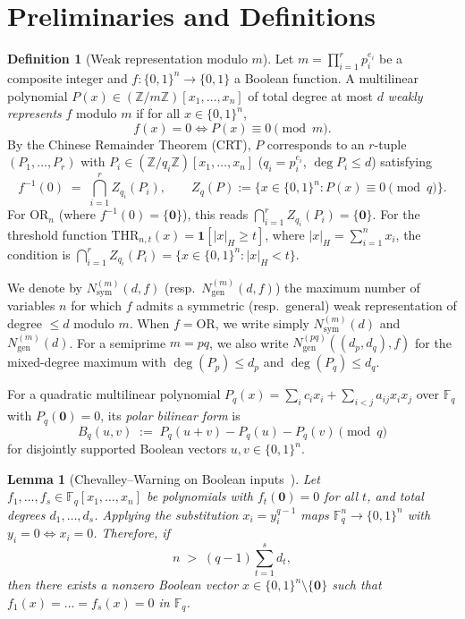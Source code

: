 \documentclass[11pt,a4paper]{article}
\newtheorem{lemma}[theorem]{Lemma}
\theoremstyle{definition}
\newtheorem{definition}[theorem]{Definition}
\newcommand{\F}{\mathbb{F}}
\newcommand{\Z}{\mathbb{Z}}
\newcommand{\OR}{\mathrm{OR}}
\newcommand{\THR}{\mathrm{THR}}
\newcommand{\Nsym}{N_{\mathrm{sym}}}
\newcommand{\Ngen}{N_{\mathrm{gen}}}
\begin{document}
\section{Preliminaries and Definitions}
\label{sec:prelim}

\begin{definition}[Weak representation modulo $m$]
Let $m = \prod_{i=1}^r p_i^{e_i}$ be a composite integer and $f : \{0,1\}^n \to \{0,1\}$ a Boolean function. A multilinear polynomial $P(x) \in (\Z/m\Z)[x_1,\dots,x_n]$ of total degree at most $d$ \emph{weakly represents} $f$ modulo $m$ if for all $x \in \{0,1\}^n$,
\[
  f(x) = 0 \iff P(x) \equiv 0 \pmod m.
\]
By the Chinese Remainder Theorem (CRT), $P$ corresponds to an $r$-tuple $(P_1,\dots,P_r)$ with $P_i \in (\Z/q_i\Z)[x_1,\dots,x_n]$ ($q_i = p_i^{e_i}$, $\deg P_i \le d$) satisfying
\[
  f^{-1}(0) \;=\; \bigcap_{i=1}^r Z_{q_i}(P_i),
  \qquad Z_q(P) := \{x \in \{0,1\}^n : P(x) \equiv 0 \pmod q\}.
\]
For $\OR_n$ (where $f^{-1}(0) = \{\mathbf{0}\}$), this reads $\bigcap_{i=1}^r Z_{q_i}(P_i) = \{\mathbf{0}\}$. For the threshold function $\THR_{n,t}(x) = \mathbf{1}[|x|_H \ge t]$, where $|x|_H = \sum_{i=1}^n x_i$, the condition is $\bigcap_{i=1}^r Z_{q_i}(P_i) = \{x \in \{0,1\}^n : |x|_H < t\}$.
\end{definition}

We denote by $\Nsym^{(m)}(d, f)$ (resp.\ $\Ngen^{(m)}(d, f)$) the maximum number of variables $n$ for which $f$ admits a symmetric (resp.\ general) weak representation of degree $\le d$ modulo $m$. When $f = \OR$, we write simply $\Nsym^{(m)}(d)$ and $\Ngen^{(m)}(d)$. For a semiprime $m = pq$, we also write $\Ngen^{(pq)}((d_p, d_q), f)$ for the mixed-degree maximum with $\deg(P_p) \le d_p$ and $\deg(P_q) \le d_q$.

For a quadratic multilinear polynomial $P_q(x) = \sum_i c_i x_i + \sum_{i<j} a_{ij} x_i x_j$ over $\F_q$ with $P_q(\mathbf{0}) = 0$, its \emph{polar bilinear form} is
\[
  B_q(u, v) \;:=\; P_q(u + v) - P_q(u) - P_q(v) \pmod q
\]
for disjointly supported Boolean vectors $u, v \in \{0,1\}^n$.

\begin{lemma}[Chevalley--Warning on Boolean inputs~\cite{Che35,War35}]
\label{lem:cw}
Let $f_1,\dots,f_s \in \F_q[x_1,\dots,x_n]$ be polynomials with $f_t(\mathbf{0}) = 0$ for all $t$, and total degrees $d_1,\dots,d_s$. Applying the substitution $x_i = y_i^{q-1}$ maps $\F_q^n \to \{0,1\}^n$ with $y_i = 0 \iff x_i = 0$. Therefore, if
\[
  n \;>\; (q - 1)\sum_{t=1}^s d_t,
\]
then there exists a nonzero Boolean vector $x \in \{0,1\}^n \setminus \{\mathbf{0}\}$ such that $f_1(x) = \dots = f_s(x) = 0$ in $\F_q$.
\end{lemma}
\end{document}
